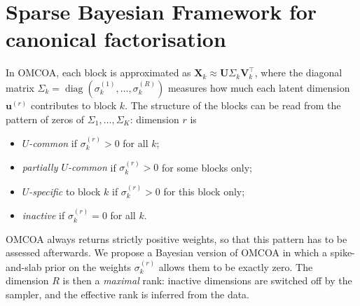 \documentclass[11pt]{article}
\newtheorem{remark}{Remark}
\DeclareMathOperator{\diag}{diag}
\newcommand{\X}{\mathbf{X}}
\newcommand{\U}{\mathbf{U}}
\newcommand{\V}{\mathbf{V}}
\newcommand{\uu}{\mathbf{u}}
\begin{document}


\section{Sparse Bayesian Framework for canonical factorisation}
In OMCOA, each block is approximated as $\X_k\approx\U\Sigma_k\V_k^\intercal$, where the diagonal matrix
$\Sigma_k=\diag(\sigma_k^{(1)},\ldots,\sigma_k^{(R)})$ measures how much each latent dimension $\uu^{(r)}$ contributes to
block $k$. The structure of the blocks can be read from the pattern of zeros of $\Sigma_1,\ldots,\Sigma_K$: dimension
$r$ is
\begin{itemize}
  \item \emph{$U$-common} if $\sigma_k^{(r)}>0$ for all $k$;
  \item \emph{partially $U$-common} if $\sigma_k^{(r)}>0$ for some blocks only;
  \item \emph{$U$-specific} to block $k$ if $\sigma_k^{(r)}>0$ for this block only;
  \item \emph{inactive} if $\sigma_k^{(r)}=0$ for all $k$.
\end{itemize}
OMCOA always returns strictly positive weights, so that this pattern has to be assessed afterwards. We propose
a Bayesian version of OMCOA in which a spike-and-slab prior on the weights $\sigma_k^{(r)}$ allows them to be exactly
zero. The dimension $R$ is then a \emph{maximal} rank: inactive dimensions are switched off by the sampler, and the
effective rank is inferred from the data.
\end{document}
